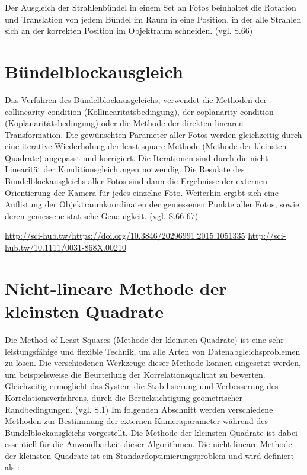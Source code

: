 Der Ausgleich der Strahlenbündel in einem Set an Fotos beinhaltet die Rotation und Translation von jedem Bündel im Raum in eine Position, in der alle Strahlen sich an der korrekten Position im Objektraum schneiden. (vgl. \cite{comparative_conditions_study} S.66)

\section{Bündelblockausgleich}

Das Verfahren des Bündelblockausgeleichs, verwendet die Methoden der \glqq collinearity condition \grqq{} (Kollinearitätsbedingung), der \glqq coplanarity condition\grqq{} (Koplanaritätsbedingung) oder die Methode der direkten linearen Transformation. Die gewünschten Parameter aller Fotos werden gleichzeitig durch eine iterative Wiederholung der \glqq least square\grqq{} Methode (Methode der kleinsten Quadrate) angepasst und korrigiert. Die Iterationen sind durch die nicht-Linearität der Konditionsgleichungen notwendig. Die Resulate des Bündelblockausgleichs aller Fotos sind dann die Ergebnisse der externen Orientierung der Kamera für jedes einzelne Foto. Weiterhin ergibt sich eine Auflistung der Objektraumkoordinaten der gemessenen Punkte aller Fotos, sowie deren gemessene statische Genauigkeit. (vgl. \cite{comparative_conditions_study} S.66-67)

\url{http://sci-hub.tw/https://doi.org/10.3846/20296991.2015.1051335}
\url{http://sci-hub.tw/10.1111/0031-868X.00210}

\section{Nicht-lineare Methode der kleinsten Quadrate}
Die \glqq Method of Least Squares\grqq{} (Methode der kleinsten Quadrate) ist eine sehr leistungsfähige und flexible Technik, um alle Arten von Datenabgleichsproblemen zu lösen. Die verschiedenen Werkzeuge dieser Methode können eingesetzt werden, um beispielsweise die Beurteilung der Korrelationsqualität zu bewerten. Gleichzeitig ermöglicht das System die Stabilisierung und Verbesserung des Korrelationsverfahrens, durch die Berücksichtigung geometrischer Randbedingungen. (vgl. \cite{least_quares} S.1) Im folgenden Abschnitt werden verschiedene Methoden zur Bestimmung der externen Kameraparameter während des Bündelblockausgleichs vorgestellt. Die Methode der kleinsten Quadrate ist dabei essentiell für die Anwendbarkeit dieser Algorithmen. Die nicht lineare Methode der kleinsten Quadrate ist ein Standardoptimierungsproblem und wird definiert als \cite{nonlinear_1} :

